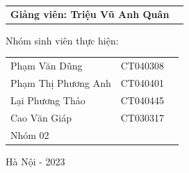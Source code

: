 \begin{titlepage}
\begin{flushleft}
		\begin{tabular}{l c}
			
			\hspace{4cm}\textbf{Giảng viên: Triệu Vũ Anh Quân} \\
			
			
		\end{tabular}
		
		\vspace{0.5cm}
		
		\hspace{3cm}Nhóm sinh viên thực hiện:
		
		\begin{tabular}{l c c}
			
			\hspace{4cm}Phạm Văn Dũng & CT040308 \\
						
			\hspace{4cm}Phạm Thị Phương Anh & CT040401 \\
			
			\hspace{4cm}Lại Phương Thảo & CT040445 \\
						
			\hspace{4cm}Cao Văn Giáp & CT030317\\
			
			\hspace{4cm}Nhóm 02
			
			
		\end{tabular}
		
	\end{flushleft}
	
	\begin{center}
		
		\vspace{1cm}
		
		Hà Nội - 2023
		
	\end{center}
\end{titlepage}